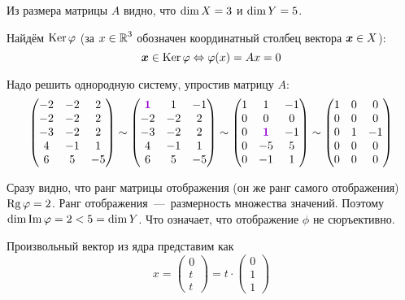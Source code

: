 \documentclass[a4paper,12pt]{article}
\DeclareMathOperator{\Image}{Im}
\begin{document}
  \begin{solution}
    Из размера матрицы $A$ видно, что $\dim X \hm= 3$ и $\dim Y \hm= 5$.
    
    Найдём $\operatorname{Ker}\varphi$ (за $x \hm\in \RR^3$ обозначен координатный столбец вектора $\boldsymbol x \in X$):
    \[
      \boldsymbol x \in \operatorname{Ker}\varphi \Leftrightarrow \varphi(x) = Ax = 0
    \]
    
    Надо решить однородную систему, упростив матрицу $A$:
    \begin{equation}\label{p-23-29-gauss}
      \begin{pmatrix}
        -2 & -2 & 2\\
        -2 & -2 & 2\\
        -3 & -2 & 2\\
        4 & -1 & 1\\
        6 & 5 & -5
      \end{pmatrix}
      \sim \begin{pmatrix}
        \textcolor{violet}{\bds 1} & 1 & -1\\
        -2 & -2 & 2\\
        -3 & -2 & 2\\
        4 & -1 & 1\\
        6 & 5 & -5
      \end{pmatrix}
      \sim \begin{pmatrix}
        1 & 1 & -1\\
        0 & 0 & 0\\
        0 & \textcolor{violet}{\bds 1} & -1\\
        0 & -5 & 5\\
        0 & -1 & 1
      \end{pmatrix}
      \sim \begin{pmatrix}
        1 & 0 & 0\\
        0 & 0 & 0\\
        0 & 1 & -1\\
        0 & 0 & 0\\
        0 & 0 & 0
      \end{pmatrix}
    \end{equation}
    
    Сразу видно, что ранг матрицы отображения (он же ранг самого отображения) $\Rg\phi \hm= 2$.
    Ранг отображения~---~размерность множества значений.
    Поэтому $\dim\Image\phi \hm= 2 \hm< 5 \hm= \dim Y$.
    Что означает, что отображение $\phi$ не сюръективно.
    
    Произвольный вектор из ядра представим как
    \[
      x = \begin{pmatrix}
        0 \\ t \\ t
      \end{pmatrix} = t \cdot \begin{pmatrix}
        0 \\ 1 \\ 1
      \end{pmatrix}
    \]
    

\end{solution}
\end{document}
